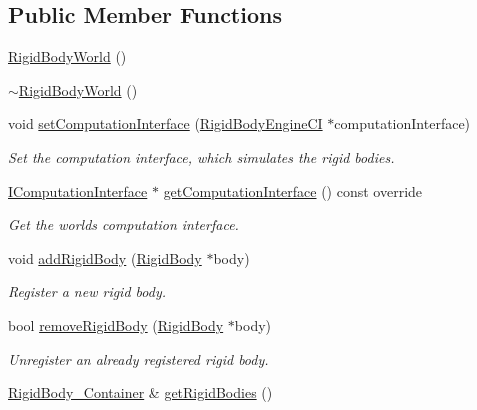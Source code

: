 \subsection*{Public Member Functions}
\begin{DoxyCompactItemize}
\item 
\mbox{\hyperlink{classr3_1_1_rigid_body_world_ae9358def6c2b1ea21d38059242fec505}{Rigid\+Body\+World}} ()
\item 
\mbox{\hyperlink{classr3_1_1_rigid_body_world_add6c229831a203d61ee8f5e2294b4192}{$\sim$\+Rigid\+Body\+World}} ()
\item 
void \mbox{\hyperlink{classr3_1_1_rigid_body_world_a0c5724007917231ebe9bd970d65b0bfe}{set\+Computation\+Interface}} (\mbox{\hyperlink{classr3_1_1_rigid_body_engine_c_i}{Rigid\+Body\+Engine\+CI}} $\ast$computation\+Interface)
\begin{DoxyCompactList}\small\item\em Set the computation interface, which simulates the rigid bodies. \end{DoxyCompactList}\item 
\mbox{\hyperlink{classr3_1_1_i_computation_interface}{I\+Computation\+Interface}} $\ast$ \mbox{\hyperlink{classr3_1_1_rigid_body_world_ac25b39a5b15666d99f42b68f29f8a97b}{get\+Computation\+Interface}} () const override
\begin{DoxyCompactList}\small\item\em Get the world\textquotesingle{}s computation interface. \end{DoxyCompactList}\item 
void \mbox{\hyperlink{classr3_1_1_rigid_body_world_ae743b90995308445e9ef985e3fde8f8f}{add\+Rigid\+Body}} (\mbox{\hyperlink{classr3_1_1_rigid_body}{Rigid\+Body}} $\ast$body)
\begin{DoxyCompactList}\small\item\em Register a new rigid body. \end{DoxyCompactList}\item 
bool \mbox{\hyperlink{classr3_1_1_rigid_body_world_a916edefa8befc0401b6f757037139931}{remove\+Rigid\+Body}} (\mbox{\hyperlink{classr3_1_1_rigid_body}{Rigid\+Body}} $\ast$body)
\begin{DoxyCompactList}\small\item\em Unregister an already registered rigid body. \end{DoxyCompactList}\item 
\mbox{\hyperlink{classr3_1_1_rigid_body_world_abe8c123eee198b6f8eca079e71302bcb}{Rigid\+Body\+\_\+\+Container}} \& \mbox{\hyperlink{classr3_1_1_rigid_body_world_a31e9a0ddd26c25327aa21b3460c52893}{get\+Rigid\+Bodies}} ()

\end{DoxyCompactItemize}
